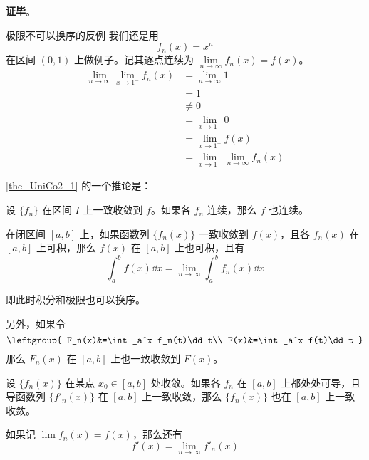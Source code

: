 
\textbf{证毕}。



\begin{example}{极限不可以换序的反例}
我们还是用
\begin{equation}
f_n(x)=x^n
\end{equation}
在区间 $(0, 1)$ 上做例子。记其逐点连续为 $\lim\limits_{n\to\infty}f_n(x)=f(x)$。
\begin{equation}
\begin{aligned}
\lim\limits_{n\to\infty}\lim\limits_{x\to 1^-}f_n(x)&=\lim\limits_{n\to\infty}1\\
&=1\\
&\not=0\\
&=\lim\limits_{x\to 1^-} 0\\
&=\lim\limits_{x\to 1^-}f(x)\\
&=\lim\limits_{x\to 1^-}\lim\limits_{n\to\infty}f_n(x)
\end{aligned}
\end{equation}
\end{example}

\autoref{the_UniCo2_1} 的一个推论是：
\begin{corollary}{}
设 $\{f_n\}$ 在区间 $I$ 上一致收敛到 $f$。如果各 $f_n$ 连续，那么 $f$ 也连续。
\end{corollary}

\begin{theorem}{}
在闭区间 $[a, b]$ 上，如果函数列 $\{f_n(x)\}$ 一致收敛到 $f(x)$，且各 $f_n(x)$ 在 $[a, b]$ 上可积，那么 $f(x)$ 在 $[a, b]$ 上也可积，且有
\begin{equation}
\int_a^b f(x) \dd x=\lim_{n\to\infty}\int_a^b f_n(x)\dd x
\end{equation}

即此时积分和极限也可以换序。

另外，如果令
\begin{equation}
\leftgroup{
    F_n(x)&=\int_a^x f_n(t)\dd t\\
    F(x)&=\int_a^x f(t)\dd t
}
\end{equation}
那么 $F_n(x)$ 在 $[a, b]$ 上也一致收敛到 $F(x)$。

\end{theorem}

\begin{theorem}{}
设 $\{f_n(x)\}$ 在某点 $x_0\in [a, b]$ 处收敛。如果各 $f_n$ 在 $[a, b]$ 上都处处可导，且导函数列 $\{f'_n(x)\}$ 在 $[a, b]$ 上一致收敛，那么 $\{f_n(x)\}$ 也在 $[a, b]$ 上一致收敛。

如果记 $\lim f_n(x)=f(x)$，那么还有
\begin{equation}
f'(x)=\lim\limits_{n\to\infty}f'_n(x)
\end{equation}
\end{theorem}

















